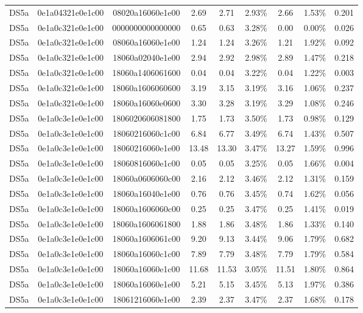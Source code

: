 \begin{tabular}{|c|c c|c|c c|c c|c|}
  DS5a & 0e1a04321e0e1c00 & 08020a16060e1e00 & 2.69 & 2.71 & 2.93\% & 2.66 & 1.53\% & 0.201 \\
  DS5a & 0e1a0c321e0e1c00 & 0000000000000000 & 0.65 & 0.63 & 3.28\% & 0.00 & 0.00\% & 0.026 \\
  DS5a & 0e1a0c321e0e1c00 & 08060a16060e1e00 & 1.24 & 1.24 & 3.26\% & 1.21 & 1.92\% & 0.092 \\
  DS5a & 0e1a0c321e0e1c00 & 18060a02040e1e00 & 2.94 & 2.92 & 2.98\% & 2.89 & 1.47\% & 0.218 \\
  DS5a & 0e1a0c321e0e1c00 & 18060a1406061600 & 0.04 & 0.04 & 3.22\% & 0.04 & 1.22\% & 0.003 \\
  DS5a & 0e1a0c321e0e1c00 & 18060a1606060600 & 3.19 & 3.15 & 3.19\% & 3.16 & 1.06\% & 0.237 \\
  DS5a & 0e1a0c321e0e1c00 & 18060a16060e0600 & 3.30 & 3.28 & 3.19\% & 3.29 & 1.08\% & 0.246 \\
  DS5a & 0e1a0c3e1e0e1c00 & 1806020606081800 & 1.75 & 1.73 & 3.50\% & 1.73 & 0.98\% & 0.129 \\
  DS5a & 0e1a0c3e1e0e1c00 & 18060216060c1c00 & 6.84 & 6.77 & 3.49\% & 6.74 & 1.43\% & 0.507 \\
  DS5a & 0e1a0c3e1e0e1c00 & 18060216060e1e00 & 13.48 & 13.30 & 3.47\% & 13.27 & 1.59\% & 0.996 \\
  DS5a & 0e1a0c3e1e0e1c00 & 18060816060e1c00 & 0.05 & 0.05 & 3.25\% & 0.05 & 1.66\% & 0.004 \\
  DS5a & 0e1a0c3e1e0e1c00 & 18060a0606060c00 & 2.16 & 2.12 & 3.46\% & 2.12 & 1.31\% & 0.159 \\
  DS5a & 0e1a0c3e1e0e1c00 & 18060a16040e1e00 & 0.76 & 0.76 & 3.45\% & 0.74 & 1.62\% & 0.056 \\
  DS5a & 0e1a0c3e1e0e1c00 & 18060a1606060c00 & 0.25 & 0.25 & 3.47\% & 0.25 & 1.41\% & 0.019 \\
  DS5a & 0e1a0c3e1e0e1c00 & 18060a1606061800 & 1.88 & 1.86 & 3.48\% & 1.86 & 1.33\% & 0.140 \\
  DS5a & 0e1a0c3e1e0e1c00 & 18060a1606061c00 & 9.20 & 9.13 & 3.44\% & 9.06 & 1.79\% & 0.682 \\
  DS5a & 0e1a0c3e1e0e1c00 & 18060a16060c1c00 & 7.89 & 7.79 & 3.48\% & 7.79 & 1.79\% & 0.584 \\
  DS5a & 0e1a0c3e1e0e1c00 & 18060a16060e1c00 & 11.68 & 11.53 & 3.05\% & 11.51 & 1.80\% & 0.864 \\
  DS5a & 0e1a0c3e1e0e1c00 & 18060a16060e1e00 & 5.21 & 5.15 & 3.45\% & 5.13 & 1.97\% & 0.386 \\
  DS5a & 0e1a0c3e1e0e1c00 & 18061216060e1e00 & 2.39 & 2.37 & 3.47\% & 2.37 & 1.68\% & 0.178 \\

\end{tabular}
